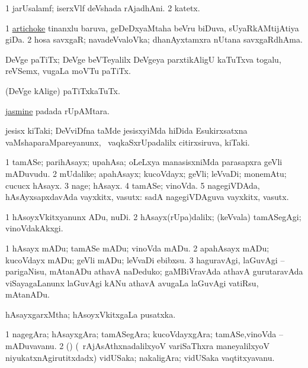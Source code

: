 \bentry
{}
\gl{\nA}
\bmng
\bnum
\num{1} jarUsalamf; iserxVlf deVshada rAjadhAni. 
\num{2} katetx. 
\enum
\emng

\noindent
\gl{\pagu}
\bmng
\bnum
\num{1}  \hyperref{kandict_a.pdf}{A}{artichoke pagu(2)}{artichoke} tinanxlu baruva, geDeDxyaMtaha beVru biDuva, sUyaRkAMtijAtiya giDa. 
\num{2}  hosa savxgaR; navadeVvaloVka; dhanAyxtamxra nUtana savxgaRdhAma. 
\enum
\emng
\eentry

\bentry
{}
\gl{\nA}
\bmng
DeVge paTiTx; DeVge beVTeyalilx DeVgeya parxtikAligU kaTuTxva togalu, reVSemx, \mo vugaLa moVTu paTiTx. 
\emng
\eentry

\bentry
{}
\gl{\sakirx}
\bmng
(DeVge kAlige) paTiTxkaTuTx. 
\emng
\eentry

\bentry
{}
\gl{\nA}
\bmng
\hyperlink{jasmine}{jasmine} padada rUpAMtara. 
\emng
\eentry

\bentry
{}
\gl{\nA}
\bmng
jesisx kiTaki; DeVviDfna taMde jesisxyiMda hiDida Esukirxsatxna vaMshaparaMpareyanunx, \sA\ vaqkaSxrUpadalilx citirxsiruva, kiTaki. 
\emng
\eentry

\bentry
{}
\gl{\nA}
\bmng
\bnum
\num{1} tamASe; parihAsayx; upahAsa; oLeLxya manasisxniMda parasapxra geVli mADuvudu. 
\num{2} mUdalike; apahAsayx; kucoVdayx; geVli; leVvaDi; monemAtu; cucucx hAsayx. 
\num{3} nage; hAsayx. 
\num{4} tamASe; vinoVda. 
\num{5} nagegiVDAda, hAsAyxsapxdavAda vayxkitx, vasutx:  sadA nagegiVDAguva vayxkitx, vasutx. 
\enum
\emng

\noindent
\gl{\pagu}
\bmng
\bnum
\num{1}  hAsoyxVkitxyanunx ADu, nuDi. 
\num{2}  hAsayx(rUpa)dalilx; (keVvala) tamASegAgi; vinoVdakAkxgi. 
\enum
\emng
\eentry

\bentry
{}
\gl{\akirx}
\bmng
\bnum
\num{1} hAsayx mADu; tamASe mADu; vinoVda mADu. 
\num{2} apahAsayx mADu; kucoVdayx mADu; geVli mADu; leVvaDi ebibxsu. 
\num{3} haguravAgi, laGuvAgi -- parigaNisu, mAtanADu athavA naDeduko; gaMBiVravAda athavA gurutaravAda viSayagaLanunx laGuvAgi kANu athavA avugaLa \vi laGuvAgi vatiRsu, mAtanADu. 
\enum
\emng
\eentry

\bentry
{}
\gl{\nA}
\bmng
hAsayxgarxMtha; hAsoyxVkitxgaLa pusatxka. 
\emng
\eentry

\bentry
{}
\gl{\nA}
\bmng
\bnum
\num{1} nagegAra; hAsayxgAra; tamASegAra; kucoVdayxgAra; tamASe,vinoVda -- mADuvavanu. 
\num{2} (\ca) (\kanmu\ rAjAsAthxnadalilxyoV variSaThxra maneyalilxyoV niyukatxnAgirutitxdadx) vidUSaka; nakaligAra; vidUSaka vaqtitxyavanu. 
\enum
\emng
\eentry

